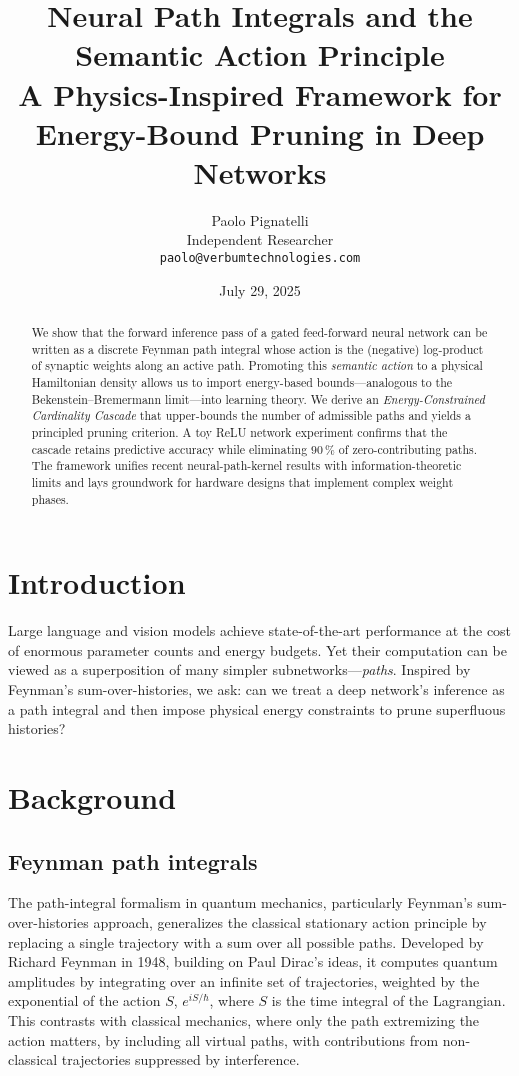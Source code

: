 \documentclass[11pt]{article}
\title{Neural Path Integrals and the Semantic Action Principle\\[2ex]
  \large A Physics-Inspired Framework for Energy-Bound Pruning in Deep Networks}
\author{Paolo Pignatelli\\Independent Researcher\\\texttt{paolo@verbumtechnologies.com}}
\date{July 29, 2025}
\begin{document}
\maketitle

\begin{abstract}
We show that the forward inference pass of a gated feed-forward neural network can be written as a discrete Feynman path integral whose action is the (negative) log-product of synaptic weights along an active path.  Promoting this \emph{semantic action} to a physical Hamiltonian density allows us to import energy-based bounds—analogous to the Bekenstein–Bremermann limit—into learning theory.  We derive an \emph{Energy-Constrained Cardinality Cascade} that upper-bounds the number of admissible paths and yields a principled pruning criterion.  A toy ReLU network experiment confirms that the cascade retains predictive accuracy while eliminating \(90\,\%\) of zero-contributing paths.  The framework unifies recent neural-path-kernel results with information-theoretic limits and lays groundwork for hardware designs that implement complex weight phases.\end{abstract}

\tableofcontents

\section{Introduction}
Large language and vision models achieve state-of-the-art performance at the cost of enormous parameter counts and energy budgets.  Yet their computation can be viewed as a superposition of many simpler subnetworks—\emph{paths}.  Inspired by Feynman's sum-over-histories, we ask: can we treat a deep network's inference as a path integral and then impose physical energy constraints to prune superfluous histories?

\section{Background}
\subsection{Feynman path integrals}
The path-integral formalism in quantum mechanics, particularly Feynman's sum-over-histories approach, generalizes the classical stationary action principle by replacing a single trajectory with a sum over all possible paths. Developed by Richard Feynman in 1948, building on Paul Dirac's ideas, it computes quantum amplitudes by integrating over an infinite set of trajectories, weighted by the exponential of the action \(S\), \(e^{iS/\hbar}\), where \(S\) is the time integral of the Lagrangian. This contrasts with classical mechanics, where only the path extremizing the action matters, by including all virtual paths, with contributions from non-classical trajectories suppressed by interference.
\end{document}
